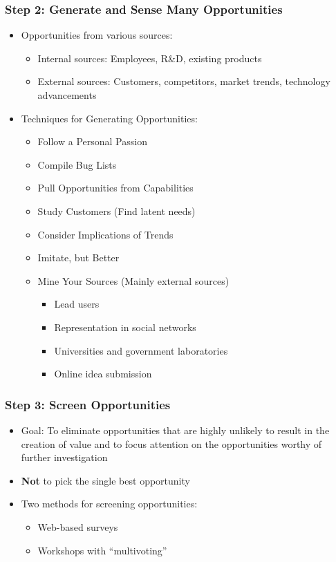\documentclass[openany,12pt,a4paper]{book}
\begin{document}
\subsubsection{Step 2: Generate and Sense Many Opportunities}
\begin{itemize}
    \item Opportunities from various sources:
    \begin{itemize}
        \item Internal sources: Employees, R\&D, existing products
        \item External sources: Customers, competitors, market trends, technology advancements
    \end{itemize}
    \item Techniques for Generating Opportunities:
    \begin{itemize}
        \item Follow a Personal Passion
        \item Compile Bug Lists
        \item Pull Opportunities from Capabilities
        \item Study Customers (Find latent needs)
        \item Consider Implications of Trends
        \item Imitate, but Better
        \item Mine Your Sources (Mainly external sources)
        \begin{itemize}
            \item Lead users
            \item Representation in social networks
            \item Universities and government laboratories
            \item Online idea submission
        \end{itemize}
    \end{itemize}
\end{itemize}

\subsubsection{Step 3: Screen Opportunities}
\begin{itemize}
    \item Goal: To eliminate opportunities that are highly unlikely to result in the creation of value and to focus attention on the opportunities worthy of further investigation
    \item \textbf{Not} to pick the single best opportunity
    \item Two methods for screening opportunities:
    \begin{itemize}
        \item Web-based surveys
        \item Workshops with ``multivoting''
    \end{itemize}
\end{itemize}
\end{document}
